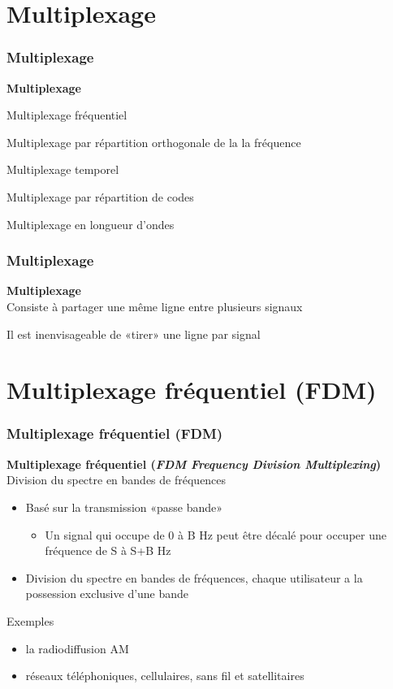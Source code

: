 \section{Multiplexage}

\begin{frame}[fragile]
  \frametitle{Multiplexage}
\begin{center}
	\Huge{\bf\color{blue}Multiplexage}
\end{center}
\begin{flushright}
	\item Multiplexage fréquentiel
	\item Multiplexage par répartition orthogonale de la la fréquence
	\item Multiplexage temporel
	\item Multiplexage par répartition de codes
	\item Multiplexage en longueur d'ondes
\end{flushright}
\end{frame}


\begin{frame}[fragile]
  \frametitle{Multiplexage}
{\bf\large  Multiplexage}\\
Consiste à partager une même ligne entre plusieurs signaux
\par Il est inenvisageable de «tirer» une ligne par signal
\end{frame}


\section{Multiplexage fréquentiel (FDM)}

\begin{frame}[fragile]
  \frametitle{Multiplexage fréquentiel (FDM)}
{\bf\large Multiplexage fréquentiel 
(\textit{FDM Frequency Division Multiplexing})}\\
Division du spectre en bandes de fréquences
\begin{itemize}
	\item Basé sur la transmission «passe bande»
	\begin{itemize}
		\item Un signal qui occupe de 0 à B Hz peut être décalé pour occuper une
		fréquence de S à S+B Hz
	\end{itemize}
	\item Division du spectre en bandes de fréquences, chaque utilisateur a la
	possession exclusive d'une bande
\end{itemize}
\vspace{1cm}
Exemples
\begin{itemize}
	\item la radiodiffusion AM
	\item réseaux téléphoniques, cellulaires, sans fil et satellitaires
\end{itemize}
\end{frame}

